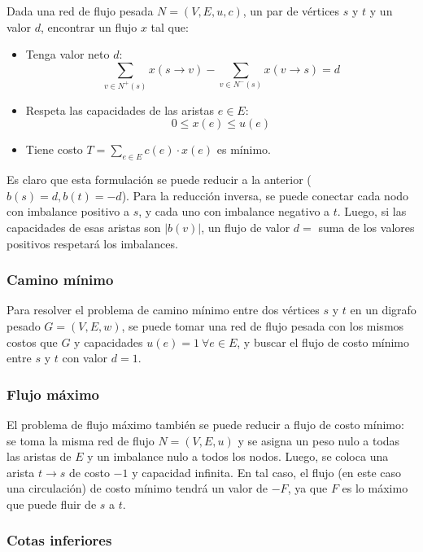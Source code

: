 \documentclass[a4paper]{report}
\begin{document}
\begin{problema}
    Dada una red de flujo pesada $N = (V, E, u, c)$, un par de vértices $s$ y $t$ y un valor $d$, encontrar un flujo $x$ tal que:
    \begin{itemize}
        \item Tenga valor neto $d$:
              $$\sum_{v \in N^+(s)} x(s \rightarrow v) - \sum_{v \in N^-(s)} x(v \rightarrow s) = d$$
        \item Respeta las capacidades de las aristas $e \in E$:
              $$0 \leq x(e) \leq u(e)$$
        \item Tiene costo $T = \sum_{e \in E} c(e) \cdot x(e)$ es mínimo.
    \end{itemize}
\end{problema}

Es claro que esta formulación se puede reducir a la anterior ($b(s) = d, b(t) = -d$). Para la reducción inversa, se puede conectar cada nodo con imbalance positivo a $s$, y cada uno con imbalance negativo a $t$. Luego, si las capacidades de esas aristas son $|b(v)|$, un flujo de valor $d = $ suma de los valores positivos respetará los imbalances.

\subsubsection{Camino mínimo}

Para resolver el problema de camino mínimo entre dos vértices $s$ y $t$ en un digrafo pesado $G = (V, E, w)$, se puede tomar una red de flujo pesada con los mismos costos que $G$ y capacidades $u(e) = 1\ \forall e \in E$, y buscar el flujo de costo mínimo entre $s$ y $t$ con valor $d = 1$.

\subsubsection{Flujo máximo}

El problema de flujo máximo también se puede reducir a flujo de costo mínimo: se toma la misma red de flujo $N = (V, E, u)$ y se asigna un peso nulo a todas las aristas de $E$ y un imbalance nulo a todos los nodos. Luego, se coloca una arista $t \rightarrow s$ de costo $-1$ y capacidad infinita. En tal caso, el flujo (en este caso una circulación) de costo mínimo tendrá un valor de $-F$, ya que $F$ es lo máximo que puede fluir de $s$ a $t$.

\subsubsection{Cotas inferiores}
\end{document}
